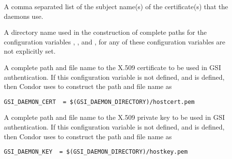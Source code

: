 \begin{description}
\item[]
\label{param:SecAuthentication} \Todo

\item[]
\label{param:SecEncryption} \Todo

\item[]
\label{param:SecIntegrity} \Todo

\item[]
\label{param:SecNegotiation} \Todo

\item[]
\label{param:SecAuthenticationMethods} \Todo

\item[]
\label{param:SecCryptoMethods} \Todo

\item[]
\label{param:GSIDaemonName} A comma separated list of the subject
name(s) of the certificate(s) that the daemons use.

\item[]
\label{param:GSIDaemonDirectory} A directory name used in the
construction of complete paths for the configuration variables
,
, and
,
for any of these configuration variables are not explicitly set.

\item[]
\label{param:GSIDaemonCert} A complete path and file name to the
X.509 certificate to be used in GSI authentication.
If this configuration variable is not defined, and
 is defined, then Condor uses
 to construct the path and file name as
\begin{verbatim}
GSI_DAEMON_CERT  = $(GSI_DAEMON_DIRECTORY)/hostcert.pem
\end{verbatim}

\item[]
\label{param:GSIDaemonKey}  A complete path and file name to the
X.509 private key to be used in GSI authentication.
If this configuration variable is not defined, and
 is defined, then Condor uses
 to construct the path and file name as
\begin{verbatim}
GSI_DAEMON_KEY  = $(GSI_DAEMON_DIRECTORY)/hostkey.pem
\end{verbatim}


\end{description}
